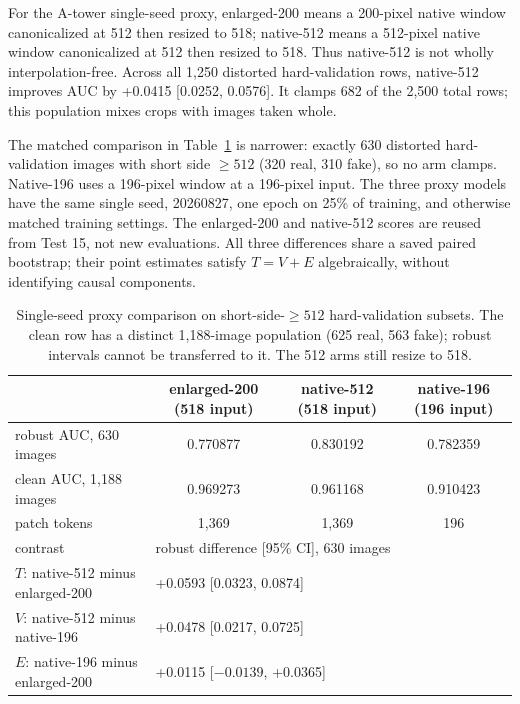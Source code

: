 \documentclass[letterpaper]{article}
\begin{document}
For the A-tower single-seed proxy, enlarged-200 means a 200-pixel native window canonicalized at 512 then resized to 518; native-512 means a 512-pixel native window canonicalized at 512 then resized to 518. Thus native-512 is not wholly interpolation-free. Across all 1,250 distorted hard-validation rows, native-512 improves AUC by +0.0415 [0.0252, 0.0576]. It clamps 682 of the 2,500 total rows; this population mixes crops with images taken whole.

The matched comparison in Table~\ref{tab:native} is narrower: exactly 630 distorted hard-validation images with short side $\geq512$ (320 real, 310 fake), so no arm clamps. Native-196 uses a 196-pixel window at a 196-pixel input. The three proxy models have the same single seed, 20260827, one epoch on 25\% of training, and otherwise matched training settings. The enlarged-200 and native-512 scores are reused from Test 15, not new evaluations. All three differences share a saved paired bootstrap; their point estimates satisfy $T=V+E$ algebraically, without identifying causal components.

\begin{table}[t]
\centering\small
\begin{tabular}{lccc}
\toprule
 & enlarged-200 (518 input) & native-512 (518 input) & native-196 (196 input) \\
\midrule
robust AUC, 630 images & 0.770877 & 0.830192 & 0.782359 \\
clean AUC, 1,188 images & 0.969273 & 0.961168 & 0.910423 \\
patch tokens & 1,369 & 1,369 & 196 \\
\midrule
contrast & \multicolumn{3}{l}{robust difference [95\% CI], 630 images} \\
$T$: native-512 minus enlarged-200 & \multicolumn{3}{l}{+0.0593 [0.0323, 0.0874]} \\
$V$: native-512 minus native-196 & \multicolumn{3}{l}{+0.0478 [0.0217, 0.0725]} \\
$E$: native-196 minus enlarged-200 & \multicolumn{3}{l}{+0.0115 [$-0.0139$, +0.0365]} \\
\bottomrule
\end{tabular}
\caption{Single-seed proxy comparison on short-side-$\geq512$ hard-validation subsets. The clean row has a distinct 1,188-image population (625 real, 563 fake); robust intervals cannot be transferred to it. The 512 arms still resize to 518.}
\label{tab:native}
\end{table}
\end{document}
